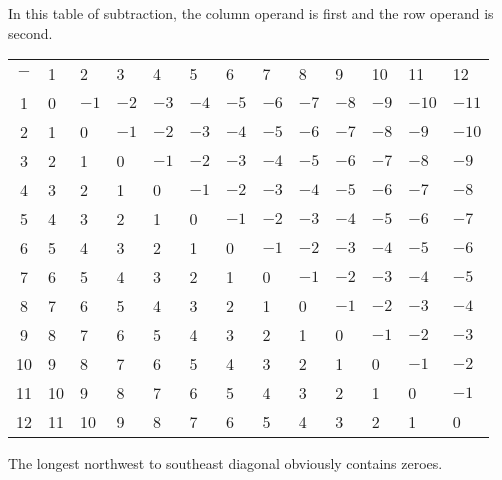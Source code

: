 \documentclass[12pt]{article}
\begin{document}
In this table of subtraction, the column operand is first and the row operand is second.

\begin{tabular}{|c|l|l|l|l|l|l|l|l|l|l|l|l|}
$-$ & 1 & 2 & 3 & 4 & 5 & 6 & 7 & 8 & 9 & 10 & 11 & 12 \\
1 & 0 & $-1$ & $-2$ & $-3$ & $-4$ & $-5$ & $-6$ & $-7$ & $-8$ & $-9$ & $-10$ & $-11$ \\
2 & 1 & 0 & $-1$ & $-2$ & $-3$ & $-4$ & $-5$ & $-6$ & $-7$ & $-8$ & $-9$ & $-10$ \\
3 & 2 & 1 & 0 & $-1$ & $-2$ & $-3$ & $-4$ & $-5$ & $-6$ & $-7$ & $-8$ & $-9$ \\
4 & 3 & 2 & 1 & 0 & $-1$ & $-2$ & $-3$ & $-4$ & $-5$ & $-6$ & $-7$ & $-8$ \\
5 & 4 & 3 & 2 & 1 & 0 & $-1$ & $-2$ & $-3$ & $-4$ & $-5$ & $-6$ & $-7$ \\
6 & 5 & 4 & 3 & 2 & 1 & 0 & $-1$ & $-2$ & $-3$ & $-4$ & $-5$ & $-6$ \\
7 & 6 & 5 & 4 & 3 & 2 & 1 & 0 & $-1$ & $-2$ & $-3$ & $-4$ & $-5$ \\
8 & 7 & 6 & 5 & 4 & 3 & 2 & 1 & 0 & $-1$ & $-2$ & $-3$ & $-4$ \\
9 & 8 & 7 & 6 & 5 & 4 & 3 & 2 & 1 & 0 & $-1$ & $-2$ & $-3$ \\
10 & 9 & 8 & 7 & 6 & 5 & 4 & 3 & 2 & 1 & 0 & $-1$ & $-2$ \\
11 & 10 & 9 & 8 & 7 & 6 & 5 & 4 & 3 & 2 & 1 & 0 & $-1$ \\
12 & 11 & 10 & 9 & 8 & 7 & 6 & 5 & 4 & 3 & 2 & 1 & 0\\
\end{tabular}


The longest northwest to southeast diagonal obviously contains zeroes.
\end{document}
